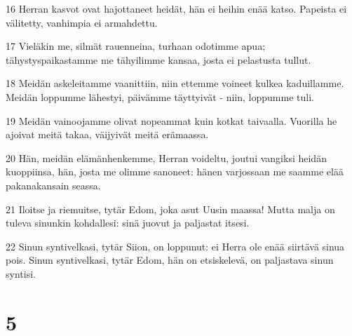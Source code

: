\par 16 Herran kasvot ovat hajottaneet heidät, hän ei heihin enää katso. Papeista ei välitetty, vanhimpia ei armahdettu.
\par 17 Vieläkin me, silmät rauenneina, turhaan odotimme apua; tähystyspaikastamme me tähyilimme kansaa, josta ei pelastusta tullut.
\par 18 Meidän askeleitamme vaanittiin, niin ettemme voineet kulkea kaduillamme. Meidän loppumme lähestyi, päivämme täyttyivät - niin, loppumme tuli.
\par 19 Meidän vainoojamme olivat nopeammat kuin kotkat taivaalla. Vuorilla he ajoivat meitä takaa, väijyivät meitä erämaassa.
\par 20 Hän, meidän elämänhenkemme, Herran voideltu, joutui vangiksi heidän kuoppiinsa, hän, josta me olimme sanoneet: hänen varjossaan me saamme elää pakanakansain seassa.
\par 21 Iloitse ja riemuitse, tytär Edom, joka asut Uusin maassa! Mutta malja on tuleva sinunkin kohdallesi: sinä juovut ja paljastat itsesi.
\par 22 Sinun syntivelkasi, tytär Siion, on loppunut: ei Herra ole enää siirtävä sinua pois. Sinun syntivelkasi, tytär Edom, hän on etsiskelevä, on paljastava sinun syntisi.

\chapter{5}

